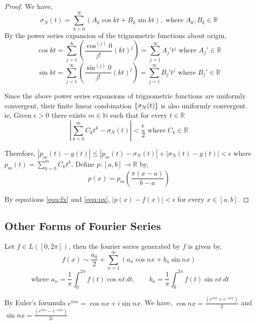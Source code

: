 \begin{proof}
		We have,
		\begin{equation}
			\sigma_N(t) = \sum_{k=0}^N \left(A_k \cos kt + B_k \sin kt \right),\text{ where } A_k, B_k \in \mathbb{R}
			\label{equ:sigmaN}
		\end{equation}
		By the power series expansion of the trignometric functions about origin,
		\begin{equation}
			\cos kt = \sum_{j = 1}^\infty \left(\frac{\cos^{(j)} 0}{j!} (kt)^j \right)  = \sum_{j = 1}^\infty A_j' t^j \text{ where } A_j' \in \mathbb{R}
			\label{equ:coskt}
		\end{equation}
		\begin{equation}
			\sin kt = \sum_{j = 1}^\infty \left(\frac{\sin^{(j)} 0}{j!} (kt)^j \right)  = \sum_{j = 1}^\infty B_j' t^j \text{ where } B_j' \in \mathbb{R}
			\label{equ:sinkt}
		\end{equation}

		Since the above power series expansions of trignometric functions are uniformly convergent, their finite linear combination \(\{\sigma_N(t)\}\) is also uniformly convergent. ie, Given \(\epsilon > 0\) there exists \(m \in \mathbb{N}\) such that for every \(t \in \mathbb{R}\)
		\[\left|\sum_{k = 0}^m C_k t^k - \sigma_N(t)\right| < \frac{\epsilon}{2} \text{ where } C_k \in \mathbb{R}\]

		Therefore, \(| p_m(t) - g(t)| \le | p_m(t) - \sigma_N(t) | + |\sigma_N(t) - g(t)| < \epsilon\) where \(p_m(t) = \sum_{k = 0}^m C_k t^k\). Define \(p : [a,b] \to \mathbb{R}\) by,
		\begin{equation}
			p(x) = p_m\left( \frac{\pi(x-a)}{b-a} \right)
			\label{equ:px}
		\end{equation}

		By equations \ref{equ:fx} and \ref{equ:px}, \(|p(x)-f(x)| < \epsilon\) for every \(x \in [a,b]\).
	\end{proof}
\subsection{Other Forms of Fourier Series}
	Let \(f \in L([0,2\pi])\), then the fourier series generated by $f$ is given by,
	\[ f(x) \sim \frac{a_0}{2}+\sum_{n=1}^\infty \left( a_n \cos nx + b_n \sin nx \right) \]
	\[ \text{ where } a_n = \frac{1}{\pi} \int_0^{2\pi} f(t) \cos nt\ dt,\qquad b_n = \frac{1}{\pi} \int_0^{2\pi} f(t) \sin nt\ dt \]

	By Euler's forumula \(e^{inx} = \cos nx + i\sin nx\). We have, \(\cos nx = \frac{(e^{inx}+e^{-inx})}{2}\) and \(\sin nx = \frac{(e^{inx}-e^{-inx})}{2i}\)

